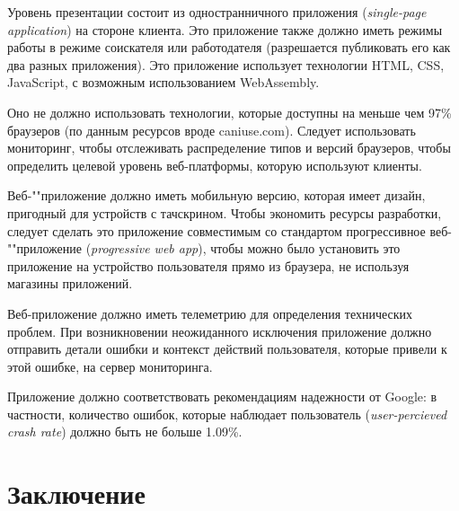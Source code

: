 \documentclass[a4page]{article}
\begin{document}
Уровень презентации состоит из одностранничного приложения
(\textit{single-page application}) на стороне клиента.
Это приложение также должно иметь режимы работы в режиме соискателя или работодателя
(разрешается публиковать его как два разных приложения).
Это приложение использует технологии HTML, CSS, JavaScript, с возможным использованием WebAssembly.

Оно не должно использовать технологии, которые доступны на меньше чем 97\% браузеров
(по данным ресурсов вроде caniuse.com).
Следует использовать мониторинг, чтобы отслеживать распределение типов и версий браузеров,
чтобы определить целевой уровень веб-платформы, которую используют клиенты.

Веб-""приложение должно иметь мобильную версию, которая имеет дизайн,
пригодный для устройств с тачскрином. Чтобы экономить ресурсы разработки,
следует сделать это приложение совместимым со стандартом
прогрессивное веб-""приложение (\textit{progressive web app}),
чтобы можно было установить это приложение на устройство пользователя
прямо из браузера, не используя магазины приложений.

Веб-приложение должно иметь телеметрию для определения технических проблем.
При возникновении неожиданного исключения приложение
должно отправить детали ошибки и контекст действий пользователя,
которые привели к этой ошибке, на сервер мониторинга.

Приложение должно соответствовать рекомендациям надежности от Google:
в частности, количество ошибок, которые наблюдает пользователь (\textit{user-percieved crash rate}) должно быть не больше 1.09\%. 

\newpage
\section{Заключение}
\end{document}
